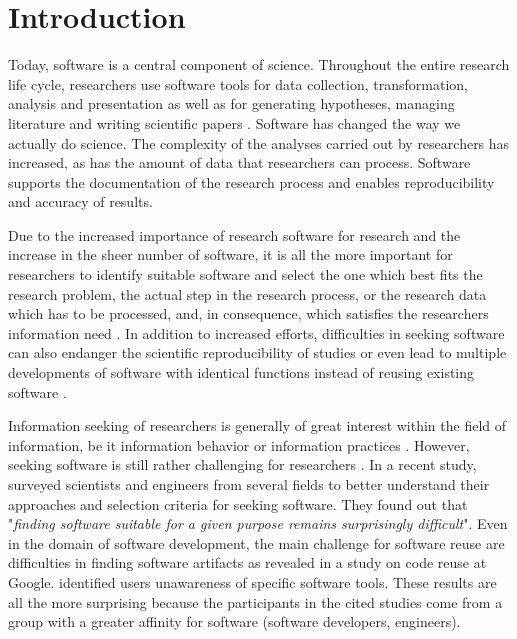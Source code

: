 \documentclass[12pt, a4paper, titlepage, oneside, abstract=true, toc=listof, toc=bibliography]{scrreprt}
\begin{document}
\chapter{Introduction}
Today, software is a central component of science. Throughout the entire research life cycle, researchers use software tools for data collection, transformation, analysis and presentation as well as for generating hypotheses, managing literature and writing scientific papers \citep{Kethers2017, Pan2016, Wolski2017}. Software has changed the way we actually do science. The complexity of the analyses carried out by researchers has increased, as has the amount of data that researchers can process. Software supports the documentation of the research process and enables reproducibility \citep{DallmeierTiessen2016, Waltemath2016} and accuracy of results.

Due to the increased importance of research software for research \citep{Katz2017} and the increase in the sheer number of software, it is all the more important for researchers to identify suitable software and select the one which best fits the research problem, the actual step in the research process, or the research data which has to be processed, and, in consequence, which satisfies the researchers information need \citep{Wilson1994}. In addition to increased efforts, difficulties in seeking software can also endanger the scientific reproducibility of studies or even lead to multiple developments of software with identical functions instead of reusing existing software \citep{Hucka2018}.

Information seeking of researchers is generally of great interest within the field of information, be it information behavior \citep[e.g.]{Ahmadianyazdi2018, Barrett2005, Campbell2017, Catalano2013, Ellis1993, Hemminger2007, Korobili2011,  Liyana2017, Rimmer2006, RuppSerrano2013, Wang2008} or information practices \citep[e.g.]{Boyum2015, Bulger2011, Fry2006, Given2018, Roos2015}. However, seeking software is still rather challenging for researchers \citep{Howison2015}. In a recent study, \citet{Hucka2018} surveyed scientists and engineers from several fields to better understand their approaches and selection criteria for seeking software. They found out that "\textit{finding software suitable for a given purpose remains surprisingly difficult}". Even in the domain of software development, the main challenge for software reuse are difficulties in finding software artifacts as \citet{Bauer2014} revealed in a study on code reuse at Google. \citet{Grossman2009} identified users unawareness of specific software tools. These results are all the more surprising because the participants in the cited studies come from a group with a greater affinity for software (software developers, engineers).
\end{document}

